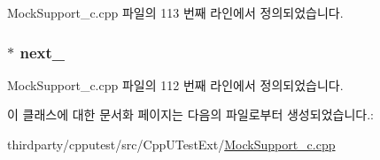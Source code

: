 Mock\+Support\+\_\+c.\+cpp 파일의 113 번째 라인에서 정의되었습니다.

\subsubsection[{\texorpdfstring{next\+\_\+}{next_}}]{$\ast$ next\+\_\+}\hypertarget{class_mock_c_function_copier_node_a783ed8acf7f9f8f2ddc70b42d0065f11}{}\label{class_mock_c_function_copier_node_a783ed8acf7f9f8f2ddc70b42d0065f11}


Mock\+Support\+\_\+c.\+cpp 파일의 112 번째 라인에서 정의되었습니다.



이 클래스에 대한 문서화 페이지는 다음의 파일로부터 생성되었습니다.\+:\begin{DoxyCompactItemize}
\item 
thirdparty/cpputest/src/\+Cpp\+U\+Test\+Ext/\hyperlink{_mock_support__c_8cpp}{Mock\+Support\+\_\+c.\+cpp}\end{DoxyCompactItemize}

